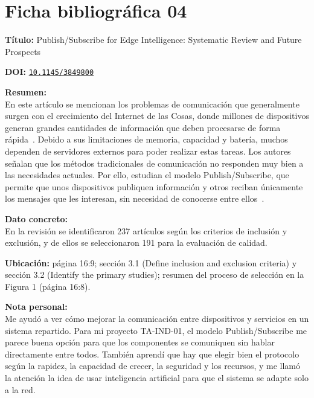 \documentclass[12pt,a4paper]{article}
\newcommand{\ficha}[6]{%
  \section*{Ficha bibliográfica #1}
  \textbf{Título:} #2

  \textbf{DOI:} \href{https://doi.org/#3}{\nolinkurl{#3}}

  \textbf{Resumen:}\\
  #4

  \textbf{Dato concreto:}\\
  #5

  \textbf{Nota personal:}\\
  #6

  \vspace{0.6cm}
}
\begin{document}
\ficha{04}
{Publish/Subscribe for Edge Intelligence: Systematic Review and Future Prospects}
{10.1145/3849800}
{En este artículo se mencionan los problemas de comunicación que generalmente surgen con el crecimiento del Internet de las Cosas, donde millones de dispositivos generan grandes cantidades de información que deben procesarse de forma rápida~\cite{saleh2026publish}. Debido a sus limitaciones de memoria, capacidad y batería, muchos dependen de servidores externos para poder realizar estas tareas. Los autores señalan que los métodos tradicionales de comunicación no responden muy bien a las necesidades actuales. Por ello, estudian el modelo Publish/Subscribe, que permite que unos dispositivos publiquen información y otros reciban únicamente los mensajes que les interesan, sin necesidad de conocerse entre ellos~\cite{saleh2026publish}.}
{En la revisión se identificaron 237 artículos según los criterios de
inclusión y exclusión, y de ellos se seleccionaron 191 para la evaluación
de calidad.
\par\medskip\textbf{Ubicación:} página 16:9; sección 3.1 (Define inclusion
and exclusion criteria) y sección 3.2 (Identify the primary studies);
resumen del proceso de selección en la Figura 1 (página 16:8).}
{Me ayudó a ver cómo mejorar la comunicación entre dispositivos y servicios en un sistema repartido. Para mi proyecto TA-IND-01, el modelo Publish/Subscribe me parece buena opción para que los componentes se comuniquen sin hablar directamente entre todos. También aprendí que hay que elegir bien el protocolo según la rapidez, la capacidad de crecer, la seguridad y los recursos, y me llamó la atención la idea de usar inteligencia artificial para que el sistema se adapte solo a la red.}
\end{document}

